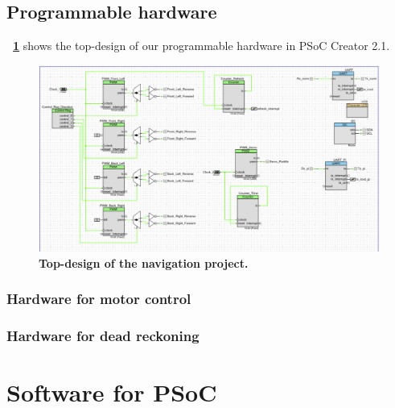 \documentclass[letterpaper, 11pt]{article}
\newcommand*{\figref}[1]{\textbf{\figurename~\ref{#1}}}
\begin{document}
\begin{enumerate}[label=\textbf{\arabic*.}]
\subsection{Programmable hardware}
\figref{fig:topdesign} shows the top-design of our programmable hardware in PSoC Creator 2.1.
\begin{figure}[ht]
    \centering
    \includegraphics[height=0.99\textwidth,
                     angle=-90, origin=c,
                     trim=1.2in 1in 1.8in 1in, clip]{images/topdesign.pdf}
    \vspace*{-3cm}
    \caption{\textbf{Top-design of the navigation project.}}
    \label{fig:topdesign}
\end{figure}

\subsubsection{Hardware for motor control}

\subsubsection{Hardware for dead reckoning}

\section{Software for PSoC}


\end{enumerate}
\end{document}
